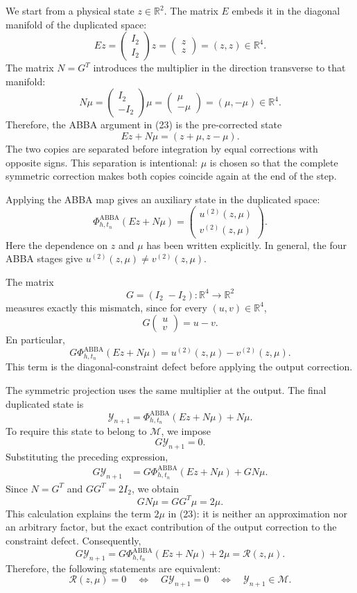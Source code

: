 \documentclass[11pt,a4paper]{article}
\newcommand{\R}{\mathbb{R}}
\newcommand{\Id}{I}
\newcommand{\Y}{\mathcal{Y}}
\newcommand{\M}{\mathcal{M}}
\newcommand{\PhiAB}{\Phi^{\mathrm{ABBA}}_{h,t_n}}
\begin{document}
We start from a physical state $z\in\R^2$. The matrix $E$ embeds it in the diagonal
manifold of the duplicated space:
\[
 Ez=
 \begin{pmatrix}\Id_2\\ \Id_2\end{pmatrix}z
 =\begin{pmatrix}z\\z\end{pmatrix}
 =(z,z)\in\R^4.
\]
The matrix $N=G^T$ introduces the multiplier in the direction transverse to that manifold:
\[
 N\mu=
 \begin{pmatrix}\Id_2\\-\Id_2\end{pmatrix}\mu
 =\begin{pmatrix}\mu\\-\mu\end{pmatrix}
 =(\mu,-\mu)\in\R^4.
\]
Therefore, the ABBA argument in (23) is the pre-corrected state
\[
 Ez+N\mu=(z+\mu,z-\mu).
\]
The two copies are separated before integration by equal corrections with opposite signs.
This separation is intentional: $\mu$ is chosen so that the complete symmetric correction
makes both copies coincide again at the end of the step.

Applying the ABBA map gives an auxiliary state in the duplicated space:
\[
 \PhiAB(Ez+N\mu)
 =\begin{pmatrix}u^{(2)}(z,\mu)\\v^{(2)}(z,\mu)\end{pmatrix}.
\]
Here the dependence on $z$ and $\mu$ has been written explicitly. In general, the four
ABBA stages give
$u^{(2)}(z,\mu)\neq v^{(2)}(z,\mu)$.

The matrix
\[
 G=(\Id_2\; -\Id_2):\R^4\longrightarrow\R^2
\]
measures exactly this mismatch, since for every $(u,v)\in\R^4$,
\[
 G\begin{pmatrix}u\\v\end{pmatrix}=u-v.
\]
En particular,
\[
 G\PhiAB(Ez+N\mu)
 =u^{(2)}(z,\mu)-v^{(2)}(z,\mu).
\]
This term is the diagonal-constraint defect before applying the output correction.

The symmetric projection uses the same multiplier at the output. The final duplicated state is
\[
 \Y_{n+1}
 =\PhiAB(Ez+N\mu)+N\mu.
\]
To require this state to belong to $\M$, we impose
\[
 G\Y_{n+1}=0.
\]
Substituting the preceding expression,
\begin{align*}
 G\Y_{n+1}
 &=G\PhiAB(Ez+N\mu)+GN\mu.
\end{align*}
Since $N=G^T$ and $GG^T=2\Id_2$, we obtain
\[
 GN\mu=GG^T\mu=2\mu.
\]
This calculation explains the term $2\mu$ in (23): it is neither an approximation nor an
arbitrary factor, but the exact contribution of the output correction to the constraint
defect. Consequently,
\[
 G\Y_{n+1}
 =G\PhiAB(Ez+N\mu)+2\mu
 =\mathcal R(z,\mu).
\]
Therefore, the following statements are equivalent:
\[
 \boxed{
 \mathcal R(z,\mu)=0
 \quad\Longleftrightarrow\quad
 G\Y_{n+1}=0
 \quad\Longleftrightarrow\quad
 \Y_{n+1}\in\M.
 }
\]
\end{document}
